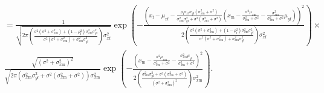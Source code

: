 \documentclass{article}
\newcommand{\x}[1]{\text{#1}}
\begin{document}
\begin{pf}
\begin{enumerate}
\begin{align*}
\\&=\frac{1}{\sqrt{2\pi \left(\frac{\sigma^2(\sigma^2+\sigma_{x\x{m}}^2)+(1-\rho_\x{f}^2)\sigma_{x\x{m}}^2\sigma_{y\x{f}}^2}{\sigma^2(\sigma^2+\sigma_{x\x{m}}^2)+\sigma_{x\x{m}}^2\sigma_{y\x{f}}^2}\right)\sigma_{x\x{f}}^2}}\exp\left(-\frac{\left(x_\x{f}-\mu_{x\x{f}}-\frac{\rho_\x{f}\sigma_{x\x{f}}\sigma_{y\x{f}}(\sigma_{x\x{m}}^2+\sigma^2)}{\sigma_{x\x{m}}^2\sigma_{y\x{f}}^2+\sigma^2(\sigma_{x\x{m}}^2+\sigma^2)}\left(x_\x{m}-\frac{\sigma^2\mu_{x\x{m}}}{\sigma_{x\x{m}}^2+\sigma^2}-\frac{\sigma_{x\x{m}}^2}{\sigma_{x\x{m}}^2+\sigma^2}\mu_{y\x{f}}\right)\right)^2}{2\left(\frac{\sigma^2(\sigma^2+\sigma_{x\x{m}}^2)+(1-\rho_\x{f}^2)\sigma_{x\x{m}}^2\sigma_{y\x{f}}^2}{\sigma^2(\sigma^2+\sigma_{x\x{m}}^2)+\sigma_{x\x{m}}^2\sigma_{y\x{f}}^2}\right)\sigma_{x\x{f}}^2}\right)\times
\\&\frac{\sqrt{(\sigma^2+\sigma_{x\x{m}}^2)^2}}{\sqrt{2\pi(\sigma_{x\x{m}}^2\sigma_{y\x{f}}^2+\sigma^2(\sigma_{x\x{m}}^2+\sigma^2))\sigma_{x\x{m}}^2}}\exp\left(-\frac{\left(x_\x{m}-\frac{\sigma^2\mu_{x\x{m}}}{\sigma_{x\x{m}}^2+\sigma^2}-\frac{\sigma_{x\x{m}}^2\mu_{y\x{f}}}{\sigma_{x\x{m}}^2+\sigma^2}\right)^2}{2\left(\frac{\sigma_{x\x{m}}^2\sigma_{y\x{f}}^2+\sigma^2(\sigma_{x\x{m}}^2+\sigma^2)}{(\sigma^2+\sigma_{x\x{m}}^2)^2}\right)\sigma_{x\x{m}}^2}\right).
\end{align*}


\end{enumerate}
\end{pf}
\end{document}
